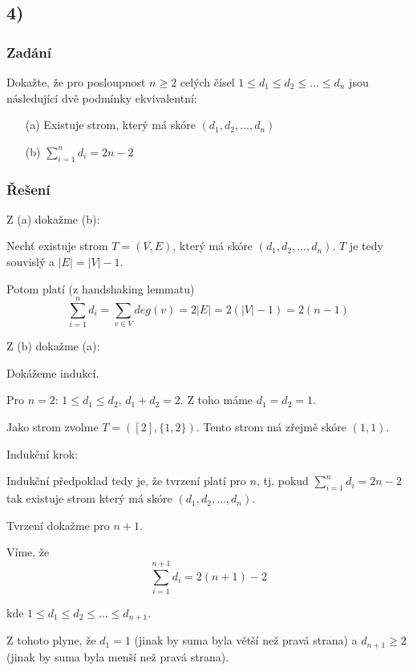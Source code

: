 \documentclass[../main.tex]{subfiles}
\begin{document}
\subsection{4)}
\subsubsection*{Zadání}

Dokažte, že pro posloupnost $n\geq 2$ celých čísel 
$1\leq d_1\leq d_2 \leq \dots \leq d_n$ jsou následující
dvě podmínky ekvivalentní:
\begin{enumerate}
    \item[(a)] Existuje strom, který má skóre $(d_1, d_2, \dots, d_n)$
    \item[(b)] $\sum_{i=1}^n d_i = 2n - 2$
\end{enumerate}


\subsubsection*{Řešení}


Z (a) dokažme (b):

Nechť existuje strom $T = (V,E)$, který má skóre $(d_1, d_2, \dots, d_n)$. $T$ je tedy souvislý a $|E|=|V|-1$.

Potom platí (z handshaking lemmatu)
\begin{equation*}
    \sum_{i=1}^n d_i = \sum_{v\in V}deg(v) = 2|E| = 2(|V| - 1) = 2(n-1)
\end{equation*}

Z (b) dokažme (a):

Dokážeme indukcí.

Pro $n=2$:
$1\leq d_1\leq d_2$, $d_1 + d_2 = 2$. Z toho máme $d_1 = d_2 = 1$.

Jako strom zvolme $T=([2], \{ 1,2\})$. Tento strom má zřejmě skóre $(1,1)$.

Indukční krok:


Indukční předpoklad tedy je, že tvrzení platí pro $n$, tj. pokud $\sum_{i=1}^n d_i = 2n - 2$ tak existuje strom který má skóre $(d_1, d_2, \dots, d_n)$.

Tvrzení dokažme pro $n+1$.

Víme, že 
\begin{equation*}
    \sum_{i=1}^{n+1} d_i = 2(n+1) - 2
\end{equation*}

kde $1\leq d_1\leq d_2 \leq \dots \leq d_{n+1}$.

Z tohoto plyne, že $d_1 =1$ (jinak by suma byla větší než pravá strana) a $d_{n+1} \geq 2$ (jinak by suma byla menší než pravá strana).
\end{document}
